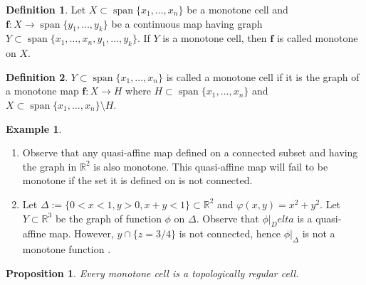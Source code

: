 \documentclass[
]{book}
\newtheorem{proposition}{Proposition}[chapter]
\theoremstyle{definition}
\newtheorem{definition}{Definition}[chapter]
\theoremstyle{definition}
\newtheorem{example}{Example}[chapter]
\theoremstyle{definition}
\theoremstyle{definition}
\theoremstyle{remark}
\begin{document}
\begin{definition}
\protect\hypertarget{def:monotone-map-on}{}\label{def:monotone-map-on}\citep[Definition 2.10]{bgv15}
Let \(X \subset {\operatorname{span} \{x_1,\ldots,x_n\}}\) be a monotone cell and \(\mathbf{f} : X \to {\operatorname{span} \{y_1,\ldots,y_k\}}\) be a continuous map having graph \(Y \subset {\operatorname{span} \{x_1,\ldots,x_n,y_1,\ldots,y_k\}}\). If \(Y\) is a monotone cell, then \(\mathbf{f}\) is called monotone on \(X\).
\end{definition}

\begin{definition}
\protect\hypertarget{def:monotone-cell}{}\label{def:monotone-cell}\citep[Definition 2.5]{bgv15}
\(Y \subset {\operatorname{span} \{x_1,\ldots,x_n\}}\) is called a monotone cell if it is the graph of a monotone map \(\mathbf{f} : X \to H\) where \(H \subset {\operatorname{span} \{x_1,\ldots,x_n\}}\) and \(X \subset {\operatorname{span} \{x_1,\ldots,x_n\}} \setminus H\).
\end{definition}

\begin{example}
\protect\hypertarget{exm:monotone-cells}{}\label{exm:monotone-cells}\leavevmode

\begin{enumerate}
\def\labelenumi{\arabic{enumi}.}
\item
  Observe that any quasi-affine map defined on a connected subset and having the graph in \(\mathbb{R}^2\) is also monotone. This quasi-affine map will fail to be monotone if the set it is defined on is not connected.
\item
  Let \(\Delta := \{ 0 < x < 1, y > 0, x + y < 1 \} \subset \mathbb{R}^2\) and \(\varphi(x,y) = x^2 + y^2\). Let \(Y \subset \mathbb{R}^3\) be the graph of function \(\phi\) on \(\Delta\). Observe that \(\phi\vert_Delta\) is a quasi-affine map. However, \(y \cap \{ z = 3/4 \}\) is not connected, hence \(\phi\vert_\Delta\) is not a monotone function \citep[Example 4.3]{bgv15}.
\end{enumerate}

\end{example}

\begin{proposition}
\protect\hypertarget{prp:monotone-topologically-regular}{}\label{prp:monotone-topologically-regular}\citep[Theorem 1]{bgv13}
Every monotone cell is a topologically regular cell.
\end{proposition}
\end{document}
